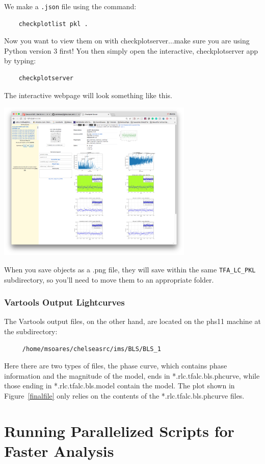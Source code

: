 \documentclass[11pt,letterpaper]{book} %
\begin{document}
We make a \texttt{.json} file using the command:
\begin{verbatim}
	checkplotlist pkl .
\end{verbatim}
Now you want to view them on with checkplotserver...make sure you are using Python version 3 first!
You then simply open the interactive, checkplotserver app by typing:
\begin{verbatim}
	checkplotserver
\end{verbatim}
The interactive webpage will look something like this.
\begin{center}
\includegraphics[width=0.7\textwidth]{checkplotserver.png}\\
\end{center}
When you save objects as a .png file, they will save within the same \texttt{TFA\_LC\_PKL} subdirectory, so you'll need to move them to an appropriate folder. 


\subsection*{Vartools Output Lightcurves}
The Vartools output files, on the other hand, are located on the phs11 machine at the subdirectory:

\begin{verbatim}
     /home/msoares/chelseasrc/ims/BLS/BLS_1
\end{verbatim}
Here there are two types of files, the phase curve, which contains phase information and the magnitude of the model, ends in *.rlc.tfalc.bls.phcurve, while those ending in *.rlc.tfalc.bls.model contain the model. The plot shown in Figure~\ref{finalfile} only relies on the contents of the *.rlc.tfalc.bls.phcurve files. 

\chapter*{Running Parallelized Scripts for Faster Analysis}
\end{document}
